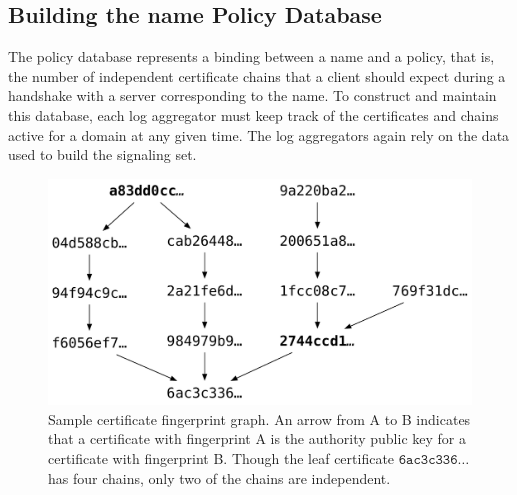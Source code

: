 \subsection{Building the \ac{name} Policy Database}
\label{sec:design:policy}

The policy database represents a binding between a name and a policy, that
is, the number of independent certificate chains that a client
should expect during a handshake with a server corresponding to the name.
To construct and maintain this database, each log aggregator must keep track of
the certificates and chains active for a domain at any given time. The log
aggregators again rely on the data used to build the signaling set.

\begin{figure}
  \centering
  \includegraphics[width=\linewidth]{fig/chain}
  \caption{Sample certificate fingerprint graph. An arrow from A to B indicates
    that a certificate with fingerprint A is the authority public key for a
    certificate with fingerprint B. Though the leaf certificate
  $\texttt{6ac3c336}\ldots$ has four chains, only two of the chains are
independent.}
  \label{fig:chain}
\end{figure}

